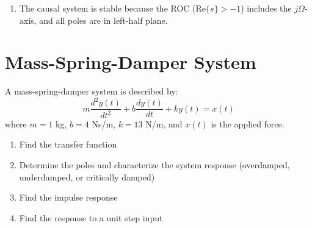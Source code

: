 \documentclass{article}
\begin{document}
\begin{enumerate}[label=(\alph*)]
    Therefore:
    \begin{align*}
        H(s) &= \frac{2.5}{s + 1} + \frac{-1.5s + 0.5}{s^2 + 2s + 5} \\
        &= \frac{2.5}{s + 1} - 1.5 \cdot \frac{s + 1}{(s + 1)^2 + 4} + 2 \cdot \frac{1}{(s + 1)^2 + 4} =  \frac{2.5}{s + 1} - 1.5 \cdot \frac{s + 1}{(s + 1)^2 + 2^2} +  \cdot \frac{2}{(s + 1)^2 + 2^2}
    \end{align*}
    Taking inverse Laplace transform using Tables:
    \[ h(t) = [2.5e^{-t} - 1.5e^{-t}\cos(2t) + e^{-t}\sin(2t)]u(t) \]
    
    \item The causal system is stable because the ROC ($\text{Re}\{s\} > -1$) includes the $j\Omega$-axis, and all poles are in left-half plane.
\end{enumerate}

\section{Mass-Spring-Damper System}
A mass-spring-damper system is described by:
\[ m\frac{d^2y(t)}{dt^2} + b\frac{dy(t)}{dt} + ky(t) = x(t) \]
where $m = 1$ kg, $b = 4$ Ns/m, $k = 13$ N/m, and $x(t)$ is the applied force.
\begin{enumerate}[label=(\alph*)]
    \item Find the transfer function
    \item Determine the poles and characterize the system response (overdamped, underdamped, or critically damped)
    \item Find the impulse response
    \item Find the response to a unit step input
\end{enumerate}
\end{document}
